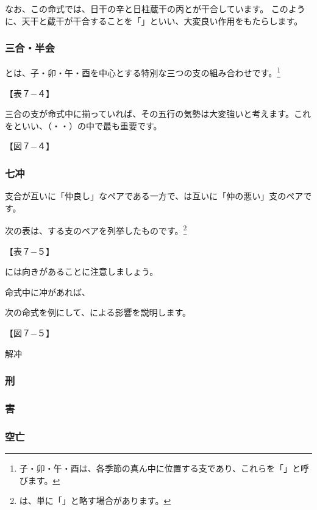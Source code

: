 \documentclass[a5paper,11pt,dvipdfmx]{tarticle}
\begin{document}
なお、この命式では、日干の辛と日柱蔵干の丙とが干合しています。
このように、天干と蔵干が干合することを「」といい、大変良い作用をもたらします。

\subsubsection*{三合・半会}
とは、子・卯・午・酉を中心とする特別な三つの支の組み合わせです。\footnote{子・卯・午・酉は、各季節の真ん中に位置する支であり、これらを「」と呼びます。}

【表７−４】

三合の支が命式中に揃っていれば、その五行の気勢は大変強いと考えます。これをといい、（・・）の中で最も重要です。

【図７−４】

\subsubsection*{七冲}
支合が互いに「仲良し」なペアである一方で、は互いに「仲の悪い」支のペアです。

次の表は、する支のペアを列挙したものです。\footnote{は、単に「」と略す場合があります。}

【表７−５】

には向きがあることに注意しましょう。

命式中に冲があれば、

次の命式を例にして、による影響を説明します。

【図７−５】


解冲


\subsubsection*{刑}


\subsubsection*{害}


\subsubsection*{空亡}
\end{document}
